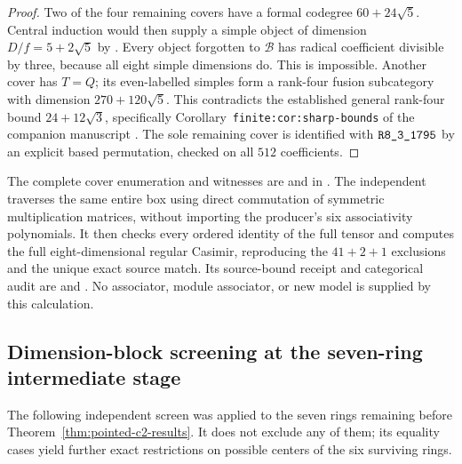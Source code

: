\begin{proof}
Two of the four remaining covers have a formal codegree
$60+24\sqrt5$.  Central induction would then supply a simple object of
dimension $D/f=5+2\sqrt5$ by \cite[Theorem~2.13]{OstrikPiv3}.
Every object forgotten to $\mathcal B$ has radical coefficient divisible
by three, because all eight simple dimensions do.  This is impossible.
Another cover has $T=Q$; its even-labelled simples form a rank-four
fusion subcategory with dimension $270+120\sqrt5$.  This contradicts
the established general rank-four bound $24+12\sqrt3$, specifically
Corollary~\texttt{finite:cor:sharp-bounds} of the companion manuscript
.
The sole remaining cover is identified with $\sha{R8_3_1795}$ by an
explicit based permutation, checked on all $512$ coefficients.
\end{proof}

The complete cover enumeration and witnesses are
 and  in
.
The independent  traverses the same entire
box using direct commutation of symmetric multiplication matrices,
without importing the producer's six associativity polynomials.  It
then checks every ordered identity of the full tensor and computes the
full eight-dimensional regular Casimir, reproducing the $41+2+1$
exclusions and the unique exact source match.  Its source-bound receipt
and categorical audit are  and
.  No associator, module associator, or new
model is supplied by this calculation.

\subsection{Dimension-block screening at the seven-ring intermediate stage}
\label{subsec:pointed-dimension-block}

The following independent screen was applied to the seven rings remaining
before Theorem~\ref{thm:pointed-c2-results}.  It does not exclude any of
them; its equality cases yield further exact restrictions on possible
centers of the six surviving rings.

